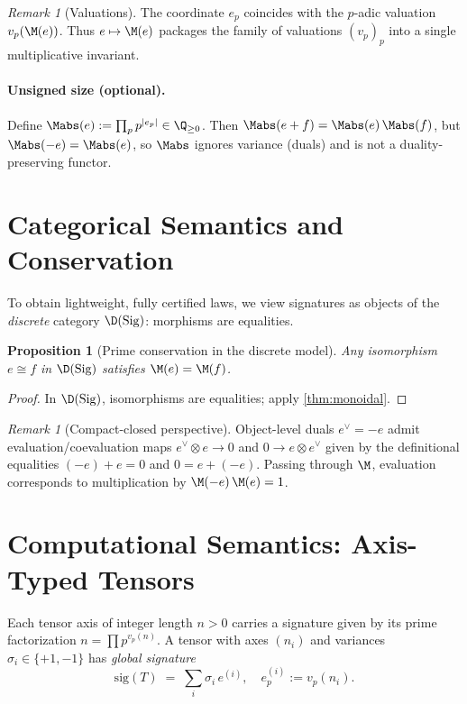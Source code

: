 \documentclass[11pt]{article}
\theoremstyle{definition}
\theoremstyle{plain}
\newtheorem{proposition}[definition]{Proposition}
\theoremstyle{remark}
\newtheorem{remark}[definition]{Remark}
\newcommand{\Sig}{\mathrm{Sig}}
\begin{document}
\begin{remark}[Valuations]
The coordinate $e_p$ coincides with the $p$-adic valuation $v_p(\M(e))$. Thus $e\mapsto \M(e)$ packages the family of valuations $(v_p)_p$ into a single multiplicative invariant.
\end{remark}

\paragraph{Unsigned size (optional).} Define $\Mabs(e):=\prod_p p^{\lvert e_p\rvert}\in \Q_{\ge 0}$. Then $\Mabs(e+f)=\Mabs(e)\,\Mabs(f)$, but $\Mabs(-e)=\Mabs(e)$, so $\Mabs$ ignores variance (duals) and is not a duality-preserving functor.

\section{Categorical Semantics and Conservation}
\label{sec:category}
To obtain lightweight, fully certified laws, we view signatures as objects of the \emph{discrete} category $\D(\Sig)$: morphisms are equalities.

\begin{proposition}[Prime conservation in the discrete model]
Any isomorphism $e\cong f$ in $\D(\Sig)$ satisfies $\M(e)=\M(f)$.
\end{proposition}
\begin{proof}
In $\D(\Sig)$, isomorphisms are equalities; apply \cref{thm:monoidal}.
\end{proof}

\begin{remark}[Compact-closed perspective]
Object-level duals $e^\vee=-e$ admit evaluation/coevaluation maps $e^\vee\otimes e\to 0$ and $0\to e\otimes e^\vee$ given by the definitional equalities $(-e)+e=0$ and $0=e+(-e)$. Passing through $\M$, evaluation corresponds to multiplication by $\M(-e)\,\M(e)=1$.
\end{remark}

\section{Computational Semantics: Axis-Typed Tensors}
\label{sec:computational}
Each tensor axis of integer length $n>0$ carries a signature given by its prime factorization $n=\prod p^{v_p(n)}$. A tensor with axes $(n_i)$ and variances $\sigma_i\in\{+1,-1\}$ has \emph{global signature}
\[
  \mathrm{sig}(T)\;=\;\sum_i \sigma_i\, e^{(i)},\quad e^{(i)}_p:=v_p(n_i).
\]
\end{document}
